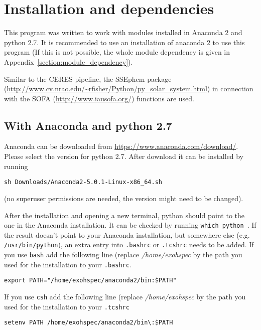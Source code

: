 \documentclass[10pt,a4paper]{article}
\begin{document}


\newpage
\section{Installation and dependencies}
\label{installation}

\noindent This program was written to work with modules installed in Anaconda 2 and python 2.7. It is recommended to use an installation of anaconda 2 to use this program (If this is not possible, the whole module dependency is given in Appendix~\ref{section:module_dependency}).

Similar to the CERES pipeline, the SSEphem package (\url{http://www.cv.nrao.edu/~rfisher/Python/py_solar_system.html}) in connection with the SOFA (\url{http://www.iausofa.org/}) functions are used. 


\subsection{With Anaconda and python 2.7}

\noindent Anaconda can be downloaded from \url{https://www.anaconda.com/download/}. Please select the version for python 2.7. After download it can be installed by running
\begin{lstlisting}[style=base]
sh Downloads/Anaconda2-5.0.1-Linux-x86_64.sh
\end{lstlisting}
(no superuser permissions are needed, the version might need to be changed).

After the installation and opening a new terminal, python should point to the one in the Anaconda installation. It can be checked by running \verb|which python|~. If the result doesn't point to your Anaconda installation, but somewhere else (e.g. \verb|/usr/bin/python|), an extra entry into \verb|.bashrc| or \verb|.tcshrc| needs to be added. If you use \verb|bash| add the following line (replace \textit{/home/exohspec} by the path you used for the installation to your \verb|.bashrc|. %
\begin{lstlisting}[style=base]
export PATH="/home/exohspec/anaconda2/bin:$PATH"
\end{lstlisting}
If you use \verb|csh| add the following line (replace \textit{/home/exohspec} by the path you used for the installation to your \verb|.tcshrc|
\begin{lstlisting}[style=base]
setenv PATH /home/exohspec/anaconda2/bin\:$PATH
\end{lstlisting}
\end{document}
